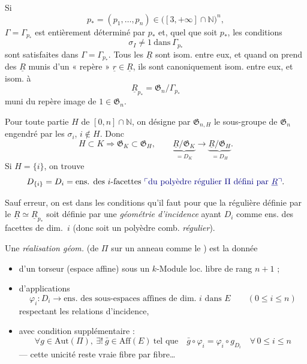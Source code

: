 \documentclass[11pt,a4paper]{article}
\begin{document}
Si
\[
p_* = (p_1,\dots,p_n)\in\bigl([3,+\infty]\cap\mathbb{N}\bigr)^n ,
\]
\struck{\ill{}} $\Gamma=\Gamma_{p_*}$ est entièrement déterminé par  $p_*$ et, quel que soit $p_*$, les conditions \struck{\ill{}}
\[
\sigma_I\neq 1 \ \text{dans}\ \Gamma_{p_*}
\]
sont satisfaites dans $\Gamma=\Gamma_{p_*}$. Tous les $\underline{R}$ sont isom. entre eux, et quand on prend des $\underline{R}$ munis d'un « repère » $\underline{r}\in\underline{R}$, ils sont canoniquement isom. entre eux, et  isom. à
\[
\underline{R}_{p_*} = \mathfrak{G}_n/\Gamma_{p_*}
\]
muni du repère image de $1\in\mathfrak{G}_n$.

Pour toute partie $H$ de  $[0,n]\cap\mathbb{N}$, on désigne par $\mathfrak{G}_{n,H}$ le sous-groupe de $\mathfrak{G}_n$ engendré par les $\sigma_i$, $i\notin H$. Donc
\[
H\subset K \Longrightarrow \mathfrak{G}_K\subset\mathfrak{G}_H ,
\qquad
\underbrace{\underline{R}/\mathfrak{G}_K}_{=D_K} \longrightarrow \underbrace{\underline{R}/\mathfrak{G}_H}_{=D_H} .
\]
Si $H=\{i\}$, on trouve
\[
D_{\{i\}} = D_i = \text{ens. des $i$-facettes \add{du polyèdre régulier $\Pi$ défini par $\underline{R}$}}.
\]

Sauf erreur, on est dans les conditions qu'il faut pour que la   régulière définie par le  $\underline{R}\simeq\underline{R}_{p_*}$ soit définie par une \emph{géométrie d'incidence} ayant \struck{\ill{}} $D_i$ comme ens. des facettes \add{$\Pi$} de dim.~$i$ (donc soit un polyèdre comb. \emph{régulier}).

Une \emph{réalisation géom.}  (de $\Pi$ \struck{\ill{}} sur un \struck{\ill{}} anneau \ill{} comme le \ill{}) est la donnée
\begin{itemize}
  \item[a)] d'un torseur (espace affine)  sous un $k$-Module loc. libre de rang $n+1$ ;
  \item[b)] d'applications
  \[
  \varphi_i : D_i \longrightarrow \text{ens. des sous-espaces affines de dim.~$i$ dans $E$} \qquad (0\leq i\leq n)
  \]
  respectant les relations d'incidence,
  \item[\struck{c)}]  avec condition supplémentaire \struck{\ill{}} :
  \[
  \forall g\in\mathrm{Aut}(\Pi),\ \exists!\ \bar g\in\mathrm{Aff}(E)\ \text{tel que}\quad \bar g\circ\varphi_i=\varphi_i\circ g_{D_i}\quad \forall\, 0\leq i\leq n
  \]
  --- cette unicité reste vraie fibre par fibre\ldots
\end{itemize}
\end{document}
